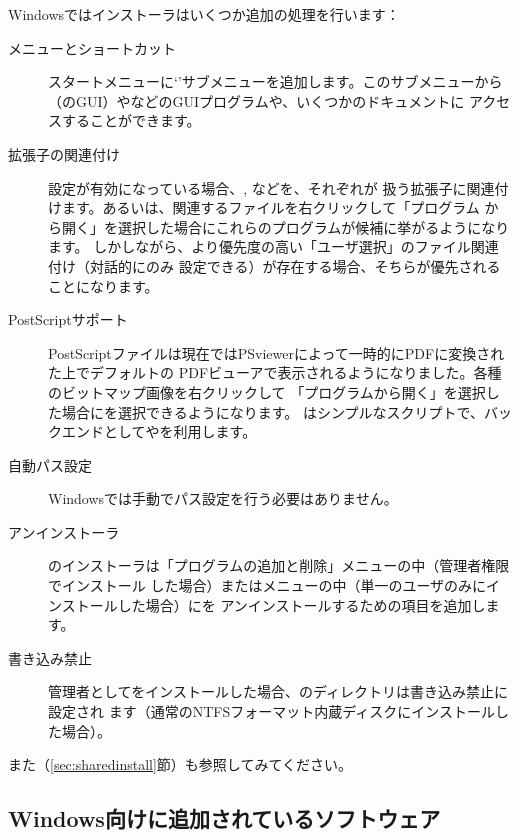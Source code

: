 \documentclass[uplatex,dvipdfmx,12pt,tombow]{jsarticle}
\begin{document}
Windowsでは\TL インストーラはいくつか追加の処理を行います：
%
\begin{description}
\item[メニューとショートカット]
スタートメニューに`\TL'サブメニューを追加します。このサブメニューから%
（のGUI）やなどのGUIプログラムや、いくつかのドキュメントに
アクセスすることができます。

\item[拡張子の関連付け]
設定が有効になっている場合、, などを、それぞれが
扱う拡張子に関連付けます。あるいは、関連するファイルを右クリックして「プログラム
から開く」を選択した場合にこれらのプログラムが候補に挙がるようになります。
しかしながら、より優先度の高い「ユーザ選択」のファイル関連付け（対話的にのみ
設定できる）が存在する場合、そちらが優先されることになります。

\item[PostScriptサポート]
PostScriptファイルは現在ではPSviewerによって一時的にPDFに変換された上でデフォルトの
PDFビューアで表示されるようになりました。各種のビットマップ画像を右クリックして
「プログラムから開く」を選択した場合にを選択できるようになります。
はシンプルなスクリプトで、バックエンドとしてやを利用します。

\item[自動パス設定]
Windowsでは手動でパス設定を行う必要はありません。

\item[アンインストーラ]
\TL のインストーラは「プログラムの追加と削除」メニューの中（管理者権限でインストール
した場合）または\TL メニューの中（単一のユーザのみにインストールした場合）に\TL を
アンインストールするための項目を追加します。

\item[書き込み禁止]
管理者として\TL をインストールした場合、\TL のディレクトリは書き込み禁止に設定され
ます（通常のNTFSフォーマット内蔵ディスクにインストールした場合）。
\end{description}

また（\ref{sec:sharedinstall}節）も参照してみてください。

\subsection{Windows向けに追加されているソフトウェア}
\end{document}
